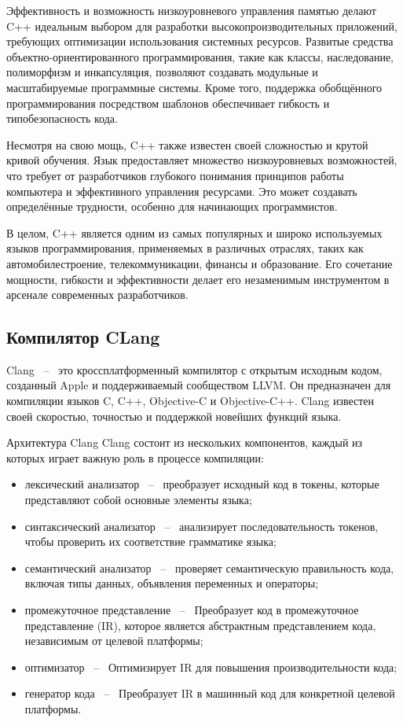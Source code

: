 Эффективность и возможность низкоуровневого управления памятью делают C++ идеальным выбором для разработки высокопроизводительных приложений, требующих оптимизации использования системных ресурсов. Развитые средства объектно-ориентированного программирования, такие как классы, наследование, полиморфизм и инкапсуляция, позволяют создавать модульные и масштабируемые программные системы. Кроме того, поддержка обобщённого программирования посредством шаблонов обеспечивает гибкость и типобезопасность кода.

Несмотря на свою мощь, C++ также известен своей сложностью и крутой кривой обучения. Язык предоставляет множество низкоуровневых возможностей, что требует от разработчиков глубокого понимания принципов работы компьютера и эффективного управления ресурсами. Это может создавать определённые трудности, особенно для начинающих программистов.

В целом, C++ является одним из самых популярных и широко используемых языков программирования, применяемых в различных отраслях, таких как автомобилестроение, телекоммуникации, финансы и образование. Его сочетание мощности, гибкости и эффективности делает его незаменимым инструментом в арсенале современных разработчиков.

\subsection{Компилятор CLang}

Clang ~--~ это кроссплатформенный компилятор с открытым исходным кодом, созданный Apple и поддерживаемый 
сообществом LLVM. Он предназначен для компиляции языков C, C++, Objective-C и Objective-C++. 
Clang известен своей скоростью, точностью и поддержкой новейших функций языка.

Архитектура Clang
Clang состоит из нескольких компонентов, каждый из которых играет важную роль в процессе компиляции:

\begin{itemize}
    \item лексический анализатор ~--~ преобразует исходный код в токены, которые представляют собой основные элементы языка;
    \item синтаксический анализатор ~--~ анализирует последовательность токенов, чтобы проверить их соответствие грамматике языка;
    \item семантический анализатор ~--~ проверяет семантическую правильность кода, включая типы данных, объявления переменных и операторы;
    \item промежуточное представление ~--~ Преобразует код в промежуточное представление (IR), которое является абстрактным представлением кода, независимым от целевой платформы;
    \item оптимизатор ~--~ Оптимизирует IR для повышения производительности кода;
    \item генератор кода ~--~ Преобразует IR в машинный код для конкретной целевой платформы.
\end{itemize}


